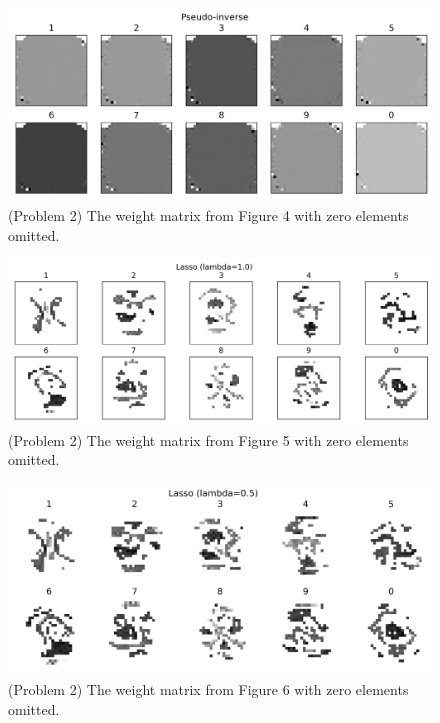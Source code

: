 \documentclass[10pt]{article}
\begin{document}
\begin{figure}[ht]
\centerline{\includegraphics[scale=0.75]{figures/weight_matrix_pinv_no_zeros.png}}
\caption{(Problem 2) The weight matrix from Figure 4 with zero elements omitted.}
\label{fig9}
\end{figure}

\begin{figure}[ht]
\centerline{\includegraphics[scale=0.75]{figures/weight_matrix_lasso_1_no_zeros.png}}
\caption{(Problem 2) The weight matrix from Figure 5 with zero elements omitted.}
\label{fig10}
\end{figure}

\begin{figure}[ht]
\centerline{\includegraphics[scale=0.75]{figures/weight_matrix_lasso_05_no_zeros.png}}
\caption{(Problem 2) The weight matrix from Figure 6 with zero elements omitted.}
\label{fig11}
\end{figure}
\end{document}
